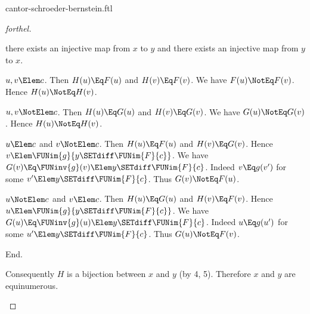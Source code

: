 \documentclass{stex}
\begin{document}
\begin{smodule}{cantor-schroeder-bernstein.ftl}
\begin{proof}[forthel]
\begin{case}{there exists an injective map from $x$ to $y$ and there exists an injective map from $y$ to $x$.}
      \begin{case}{$u,v \Elem c$.}
        Then $H(u) \Eq F(u)$ and $H(v) \Eq F(v)$.
        We have $F(u) \NotEq F(v)$.
        Hence $H(u) \NotEq H(v)$.
      \end{case}

      \begin{case}{$u,v \NotElem c$.}
        Then $H(u) \Eq G(u)$ and $H(v) \Eq G(v)$.
        We have $G(u) \NotEq G(v)$.
        Hence $H(u) \NotEq H(v)$.
      \end{case}

      \begin{case}{$u \Elem c$ and $v \NotElem c$.}
        Then $H(u) \Eq F(u)$ and $H(v) \Eq G(v)$.
        Hence $v \Elem \FUNim{g}{y \SETdiff \FUNim{F}{c}}$.
        We have $G(v) \Eq \FUNinv{g}(v) \Elem y \SETdiff \FUNim{F}{c}$.
        Indeed $v \Eq g(v')$ for some $v' \Elem y \SETdiff \FUNim{F}{c}$.
        Thus $G(v) \NotEq F(u)$.
      \end{case}

      \begin{case}{$u \NotElem c$ and $v \Elem c$.}
        Then $H(u) \Eq G(u)$ and $H(v) \Eq F(v)$.
        Hence $u \Elem \FUNim{g}{y \SETdiff \FUNim{F}{c}}$.
        We have $G(u) \Eq \FUNinv{g}(u) \Elem y \SETdiff \FUNim{F}{c}$.
        Indeed $u \Eq g(u')$ for some $u' \Elem y \SETdiff \FUNim{F}{c}$.
        Thus $G(u) \NotEq F(v)$.
      \end{case}
    End.

    Consequently $H$ is a bijection between $x$ and $y$ (by 4, 5).
    Therefore $x$ and $y$ are equinumerous.
  \end{case}
\end{proof}

\printbibliography
{}
\end{smodule}
\end{document}
